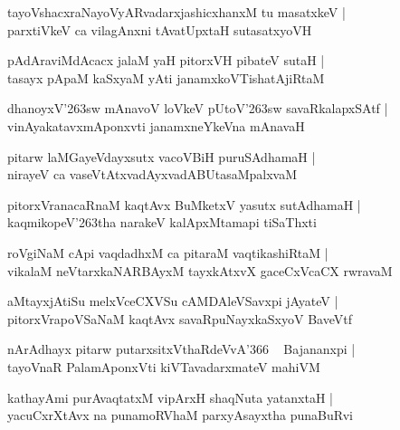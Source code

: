 \documentclass[twoside,12pt,openright]{book}
\def\S{\char'263}
\newcounter{shloka}[chapter]
\begin{document}
\begin{shloka}%
tayoVshacxraNayoVyARvadarxjashicxhanxM tu masatxkeV |\\
parxtiVkeV ca vilagAnxni tAvatUpxtaH sutasatxyoVH
\end{shloka}

\begin{shloka}%
pAdAraviMdAcacx jalaM yaH pitorxVH pibateV sutaH |\\
tasayx pApaM kaSxyaM yAti janamxkoVTishatAjiRtaM 
\end{shloka}

\begin{shloka}%
dhanoyxV\S sw mAnavoV loVkeV pUtoV\S sw savaRkalapxSAtf |\\
vinAyakatavxmAponxvti janamxneYkeVna mAnavaH 
\end{shloka}

\begin{shloka}%
pitarw laMGayeVdayxsutx vacoVBiH puruSAdhamaH |\\
nirayeV ca vaseVtAtxvadAyxvadABUtasaMpalxvaM 
\end{shloka}

\begin{shloka}%
pitorxVranacaRnaM kaqtAvx BuMketxV yasutx sutAdhamaH |\\
kaqmikopeV\S tha narakeV kalApxMtamapi tiSaThxti
\end{shloka}

\begin{shloka}%
roVgiNaM cApi vaqdadhxM ca pitaraM vaqtikashiRtaM |\\
vikalaM neVtarxkaNARBAyxM tayxkAtxvX gaceCxVcaCX rwravaM 
\end{shloka}

\begin{shloka}%
aMtayxjAtiSu melxVceCXVSu cAMDAleVSavxpi jAyateV |\\
pitorxVrapoVSaNaM kaqtAvx savaRpuNayxkaSxyoV BaveVtf
\end{shloka}

\begin{shloka}%
nArAdhayx pitarw putarxsitxVthaRdeVvA\char'366 ~ Bajananxpi |\\
tayoVnaR PalamAponxVti kiVTavadarxmateV mahiVM 
\end{shloka}

\begin{shloka}%
kathayAmi purAvaqtatxM vipArxH shaqNuta yatanxtaH |\\
yacuCxrXtAvx na punamoRVhaM parxyAsayxtha punaBuRvi
\end{shloka}
\end{document}
